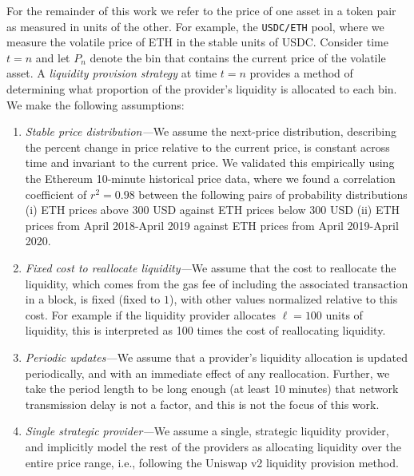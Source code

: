 \documentclass[sigconf, usenames, dvipsnames]{acmart}
\begin{document}
For the remainder of this work we refer to the  price of one asset in a token pair as measured in units of the other. For example, the \texttt{USDC/ETH} pool, where we measure the volatile price of ETH in the stable units of USDC. Consider time $t=n$ and let $P_n$ denote the bin that contains the current price of the volatile asset.
%
A {\em liquidity provision strategy} at time $t=n$ provides a method of determining what proportion of the provider's liquidity  is allocated to each bin.
%
We make the following assumptions:
%
\begin{enumerate}
    \item \textit{Stable price distribution---}We assume the next-price distribution, describing the percent change in price relative to the current price, is constant across time and invariant to the current price. We validated this empirically using the Ethereum 10-minute historical price data, where we found a correlation coefficient of $r^2=0.98$ between the following pairs of probability distributions (i) ETH prices above 300 USD against ETH prices below 300 USD (ii) ETH prices from April 2018-April 2019 against ETH prices from April 2019-April 2020.
    \item \textit{Fixed cost to reallocate liquidity---}We assume that the cost to reallocate the liquidity, which comes from the gas fee of including the associated transaction in a block, is fixed (fixed to $1$), with other values normalized relative to this cost. %
    For example if the liquidity provider allocates $\ell=100$ units of liquidity, this is interpreted as 100 times the cost of reallocating  liquidity.%
    \item \textit{Periodic updates---}We assume that a provider's liquidity allocation is updated periodically, and with an immediate effect of any reallocation. Further, we take the period length to be long enough (at least 10 minutes) that network transmission delay is not a factor, and this is not the focus of this work.
    \item \textit{Single strategic provider---}We assume a single, strategic liquidity provider, and implicitly model the rest of the providers as  allocating liquidity over the entire price range, i.e., following the Uniswap v2 liquidity provision method.
\end{enumerate}
\end{document}
